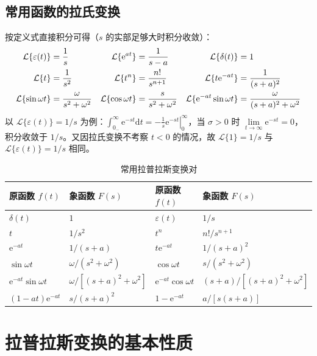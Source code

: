 \subsection{常用函数的拉氏变换}
按定义式直接积分可得（$s$ 的实部足够大时积分收敛）：
\begin{align}
  \mathcal{L}\{\varepsilon(t)\}&=\frac1s &
  \mathcal{L}\{\mathrm{e}^{at}\}&=\frac{1}{s-a} &
  \mathcal{L}\{\delta(t)\}&=1 \label{eq:ch9-basic}\\
  \mathcal{L}\{t\}&=\frac{1}{s^2} &
  \mathcal{L}\{t^n\}&=\frac{n!}{s^{n+1}} &
  \mathcal{L}\{t\mathrm{e}^{-at}\}&=\frac{1}{(s+a)^2} \notag\\
  \mathcal{L}\{\sin\omega t\}&=\frac{\omega}{s^2+\omega^2} &
  \mathcal{L}\{\cos\omega t\}&=\frac{s}{s^2+\omega^2} &
  \mathcal{L}\{\mathrm{e}^{-at}\sin\omega t\}&=\frac{\omega}{(s+a)^2+\omega^2} \notag
\end{align}
以 $\mathcal{L}\{\varepsilon(t)\}=1/s$ 为例：$\displaystyle\int_{0_-}^{\infty}\mathrm{e}^{-st}\mathrm{d}t
=\left.-\frac1s\mathrm{e}^{-st}\right|_0^\infty$，当 $\sigma>0$ 时 $\lim\limits_{t\to\infty}\mathrm{e}^{-st}=0$，
积分收敛于 $1/s$。又因拉氏变换不考察 $t<0$ 的情况，故 $\mathcal{L}\{1\}=1/s$ 与 $\mathcal{L}\{\varepsilon(t)\}=1/s$ 相同。

\begin{table}[htbp]
  \centering
  \renewcommand{\tablename}{表}%
  \caption{常用拉普拉斯变换对}
  \begin{tabular}{llll}
    \toprule
    原函数 $f(t)$ & 象函数 $F(s)$ & 原函数 $f(t)$ & 象函数 $F(s)$ \\
    \midrule
    $\delta(t)$ & $1$ & $\varepsilon(t)$ & $1/s$ \\
    $t$ & $1/s^2$ & $t^n$ & $n!/s^{n+1}$ \\
    $\mathrm{e}^{-at}$ & $1/(s+a)$ & $t\mathrm{e}^{-at}$ & $1/(s+a)^2$ \\
    $\sin\omega t$ & $\omega/(s^2+\omega^2)$ & $\cos\omega t$ & $s/(s^2+\omega^2)$ \\
    $\mathrm{e}^{-at}\sin\omega t$ & $\omega/[(s+a)^2+\omega^2]$ & $\mathrm{e}^{-at}\cos\omega t$ & $(s+a)/[(s+a)^2+\omega^2]$ \\
    $(1-at)\mathrm{e}^{-at}$ & $s/(s+a)^2$ & $1-\mathrm{e}^{-at}$ & $a/[s(s+a)]$ \\
    \bottomrule
  \end{tabular}
\end{table}

\section{拉普拉斯变换的基本性质}

